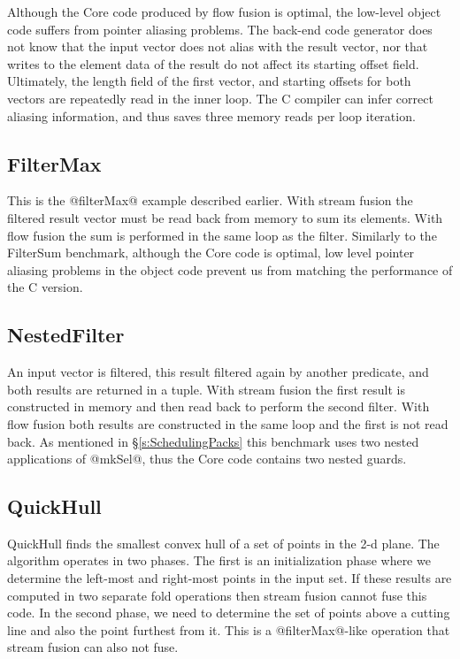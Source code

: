 Although the Core code produced by flow fusion is optimal, the low-level object code suffers from pointer aliasing problems. The back-end code generator does not know that the input vector does not alias with the result vector, nor that writes to the element data of the result do not affect its starting offset field. Ultimately, the length field of the first vector, and starting offsets for both vectors are repeatedly read in the inner loop. The C compiler can infer correct aliasing information, and thus saves three memory reads per loop iteration.


\subsection{FilterMax}
This is the @filterMax@ example described earlier. With stream fusion the filtered result vector must be read back from memory to sum its elements. With flow fusion the sum is performed in the same loop as the filter. Similarly to the FilterSum benchmark, although the Core code is optimal, low level pointer aliasing problems in the object code prevent us from matching the performance of the C version.


\subsection{NestedFilter}
An input vector is filtered, this result filtered again by another predicate, and both results are returned in a tuple. With stream fusion the first result is constructed in memory and then read back to perform the second filter. With flow fusion both results are constructed in the same loop and the first is not read back. As mentioned in \S\ref{s:SchedulingPacks} this benchmark uses two nested applications of @mkSel@, thus the Core code contains two nested guards. 


\subsection{QuickHull}
QuickHull finds the smallest convex hull of a set of points in the 2-d plane. The algorithm operates in two phases. The first is an initialization phase where we determine the left-most and right-most points in the input set. If these results are computed in two separate fold operations then stream fusion cannot fuse this code. In the second phase, we need to determine the set of points above a cutting line and also the point furthest from it. This is a @filterMax@-like operation that stream fusion can also not fuse.


